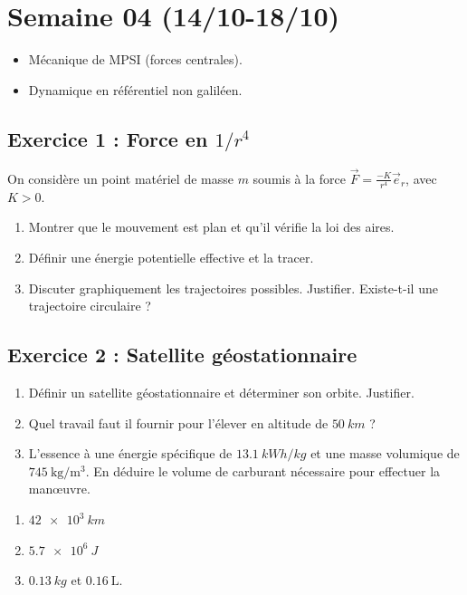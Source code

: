 \section{Semaine 04 (14/10-18/10) }


\begin{itemize}
	\item Mécanique de MPSI (forces centrales).
	\item Dynamique en référentiel non galiléen.
\end{itemize}

\subsection{Exercice 1 : Force en $1/r^4$}

On considère un point matériel de masse $m$ soumis à la force $\vec{F} = \frac{-K}{r^4} \vec{e}_r$, avec $K>0$.

\begin{enumerate}
	\item Montrer que le mouvement est plan et qu'il vérifie la loi des aires.
	\item Définir une énergie potentielle effective et la tracer.
	\item Discuter graphiquement les trajectoires possibles. Justifier. Existe-t-il une trajectoire circulaire ?
\end{enumerate}

\subsection{Exercice 2 : Satellite géostationnaire}

\begin{enumerate}
	\item Définir un satellite géostationnaire et déterminer son orbite. Justifier.
	\item Quel travail faut il fournir pour l'élever en altitude de $\SI{50}{km}$ ? 
	\item L'essence à une énergie spécifique de $\SI{13.1}{kWh/kg}$ et une masse volumique de $\SI{745}{\kilogram\per\cubic\meter}$. En déduire le volume de carburant nécessaire pour effectuer la manœuvre.
\end{enumerate}

\begin{enumerate}
	\item $\SI{42e3}{km}$
	\item $\SI{5.7e6}{J}$
	\item $\SI{0.13}{kg}$ et $\SI{0.16}{\liter}$.
\end{enumerate}

